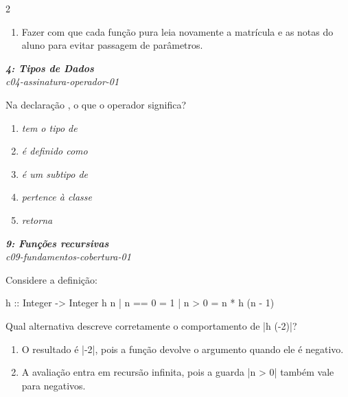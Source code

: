 \documentclass[a4paper,10pt,brazil]{article}
\begin{document}
\begin{multicols}{2}
\begin{enumerate}
  \item Fazer com que cada função pura leia novamente a matrícula e as notas do aluno para evitar passagem de parâmetros.


\end{enumerate}

\begin{flushright}
  \footnotesize
  \textit{\textbf{4: Tipos de Dados}}\\
  \textit{c04-assinatura-operador-01}\\

\end{flushright}
Na declaração , o que o operador \haskellinline{::} significa?

\begin{enumerate}
  \item \emph{tem o tipo de}

  \item \emph{é definido como}

  \item \emph{é um subtipo de}

  \item \emph{pertence à classe}

  \item \emph{retorna}


\end{enumerate}

\begin{flushright}
  \footnotesize
  \textit{\textbf{9: Funções recursivas}}\\
  \textit{c09-fundamentos-cobertura-01}\\

\end{flushright}
Considere a definição:
\begin{haskellcode}
h :: Integer -> Integer
h n
  | n == 0 = 1
  | n > 0  = n * h (n - 1)
\end{haskellcode}
Qual alternativa descreve corretamente o comportamento de \haskellinline|h (-2)|?

\begin{enumerate}
  \item O resultado é \haskellinline|-2|, pois a função devolve o argumento quando ele é negativo.

  \item A avaliação entra em recursão infinita, pois a guarda \haskellinline|n > 0| também vale para negativos.


\end{enumerate}
\end{multicols}
\end{document}
